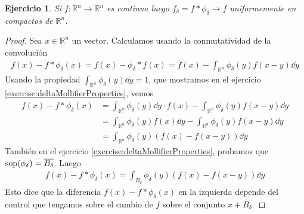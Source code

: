 \documentclass{article}
\newcommand{\realNumbers}{\mathbb{R}}
\newtheorem{exercise}{Ejercicio}
\DeclareMathOperator{\support}{\textnormal{sop}}
\theoremstyle{remark}
\begin{document}
  \begin{exercise}
    \label{exercise:convolutionCompactUniformConvergence}
    Si \(f : \realNumbers^n \rightarrow \realNumbers^n\) es continua luego \(f_{\delta} = f * \phi_{\delta} \rightarrow f\) uniformemente en compactos de \(\realNumbers^n\).
  \end{exercise}
  \begin{proof}
    Sea \(x \in \realNumbers^n\) un vector.
    Calculamos usando la conmutatividad de la convolución
    \begin{align}
      f(x) - f * \phi_{\delta} (x)
      =
      f(x) - \phi_{\delta} * f (x)
      =
      f(x) - \int_{\realNumbers^n} \phi_{\delta}(y) f(x - y) \dd y
    \end{align}
    Usando la propiedad \(\int_{\realNumbers^n} \phi_{\delta}(y) \dd y = 1\), que mostramos en el ejercicio \ref{exercise:deltaMollifierProperties}, vemos
    \begin{align}
      f(x) - f * \phi_{\delta}(x)
      &=
      \int_{\realNumbers^n} \phi_{\delta}(y) \dd y \cdot f(x) - \int_{\realNumbers^n} \phi_{\delta}(y) f(x - y) \dd y
      \\
      &=
      \int_{\realNumbers^n} \phi_{\delta}(y) f(x) \dd y - \int_{\realNumbers^n} \phi_{\delta}(y) f(x - y) \dd y
      \\
      &=
      \int_{\realNumbers^n} \phi_{\delta}(y) (f(x) - f(x - y)) \dd y
    \end{align}
    También en el ejercicio \ref{exercise:deltaMollifierProperties}, probamos que \(\support(\phi_{\delta}) = \overline{B_{\delta}}\).
    Luego
    \begin{align}
      f(x) - f * \phi_{\delta}(x)
      =
      \int_{\overline{B_{\delta}}} \phi_{\delta}(y) (f(x) - f(x - y)) \dd y
    \end{align}
    Esto dice que la diferencia \(f(x) - f * \phi_{\delta}(x)\) en la izquierda depende del control que tengamos sobre el cambio de \(f\) sobre el conjunto \(x + \overline{B_{\delta}}\).


\end{proof}
\end{document}
